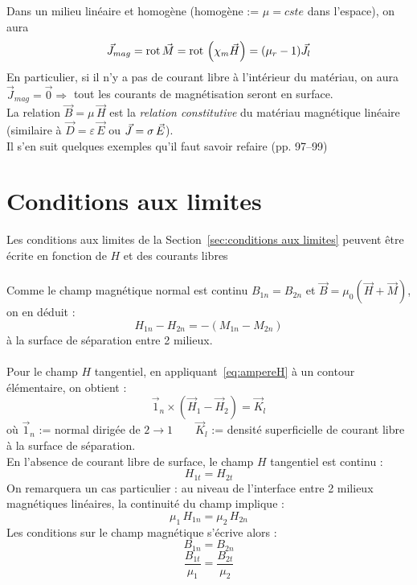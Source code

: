 \documentclass[11pt, a4paper, openany]{book}
\begin{document}
		Dans un milieu linéaire et homogène (homogène := $\mu=cste$ dans l'espace), on aura 
		\begin{equation}
		\vec J_{mag}=\rot\vec M=\rot\left(\chi_m\vec H\right)=(\mu_r-1)\vec J_{l}
		\end{equation}
		En particulier, si il n'y a pas de courant libre à l'intérieur du matériau, on aura $\vec J_{mag}=\vec{0}\Rightarrow$ tout les courants de magnétisation seront en surface.\\
		
		La relation $\vec B=\mu\,\vec H$ est la \textit{relation constitutive} du matériau magnétique linéaire (similaire à $\vec D=\varepsilon\,\vec E$ ou $\vec J=\sigma\,\E$).\\
		
		Il s'en suit quelques exemples qu'il faut savoir refaire (pp. 97--99)
		\setcounter{section}{4}
		\section{Conditions aux limites}\label{sec:conditions aux limites (magnétisme)}
		Les conditions aux limites de la Section~\ref{sec:conditions aux limites} peuvent être écrite en fonction de $H$ et des courants libres\\\\
		Comme le champ magnétique normal est continu $B_{1n}=B_{2n}$ et $\vec B=\mu_0\left(\vec H+\vec M\right)$, on en déduit :
		\begin{equation}
		H_{1n}-H_{2n}=-(M_{1n}-M_{2n})
		\end{equation}
		à la surface de séparation entre 2 milieux.\\\\
		Pour le champ $H$ tangentiel, en appliquant~\eqref{eq:ampereH} à un contour élémentaire, on obtient : 
		\begin{equation}
		\vec 1_n\times\left(\vec H_1-\vec H_2\right)=\vec K_{l}
		\end{equation}
		où $\vec 1_n$ := normal dirigée de $2\rightarrow 1\qquad\vec K_{l}$ := densité superficielle de courant libre à la surface de séparation.\\
		
		En l'absence de courant libre de surface, le champ $H$ tangentiel est continu : 
		\begin{equation}
		H_{1t}=H_{2t}
		\end{equation}
		On remarquera un cas particulier : au niveau de l'interface entre 2 milieux magnétiques linéaires, la continuité du champ implique :
		\begin{equation}
		\mu_1\, H_{1n}=\mu_2\, H_{2n}
		\end{equation}
		Les conditions sur le champ magnétique s'écrive alors : 
		$$
		B_{1n}=B_{2n}$$ $$
		\frac{B_{1t}}{\mu_1}=\frac{B_{2t}}{\mu_2}
		$$
\end{document}
